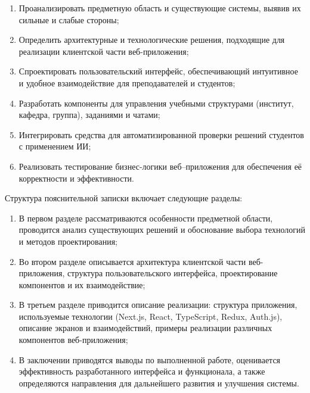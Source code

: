 \begin{enumerate}
  \item Проанализировать предметную область и существующие системы, выявив их сильные и слабые стороны;
  \item Определить архитектурные и технологические решения, подходящие для реализации клиентской части веб-приложения;
  \item Спроектировать пользовательский интерфейс, обеспечивающий интуитивное и удобное взаимодействие для преподавателей и студентов;
  \item Разработать компоненты для управления учебными структурами (институт, кафедра, группа), заданиями и чатами;
  \item Интегрировать средства для автоматизированной проверки решений студентов с применением ИИ;
  \item Реализовать тестирование бизнес-логики веб–приложения для обеспечения её корректности и эффективности.
\end{enumerate}

Структура пояснительной записки включает следующие разделы:
\begin{enumerate}
  \item В первом разделе рассматриваются особенности предметной области, проводится анализ существующих решений и обоснование выбора технологий и методов проектирования;
  \item Во втором разделе описывается архитектура клиентской части веб-приложения, структура пользовательского интерфейса, проектирование компонентов и их взаимодействие;
  \item В третьем разделе приводится описание реализации: структура приложения, используемые технологии (Next.js, React, TypeScript, Redux, Auth.js), описание экранов и взаимодействий, примеры реализации различных компонентов веб-приложения;
  \item В заключении приводятся выводы по выполненной работе, оценивается эффективность разработанного интерфейса и функционала, а также определяются направления для дальнейшего развития и улучшения системы.
\end{enumerate}
